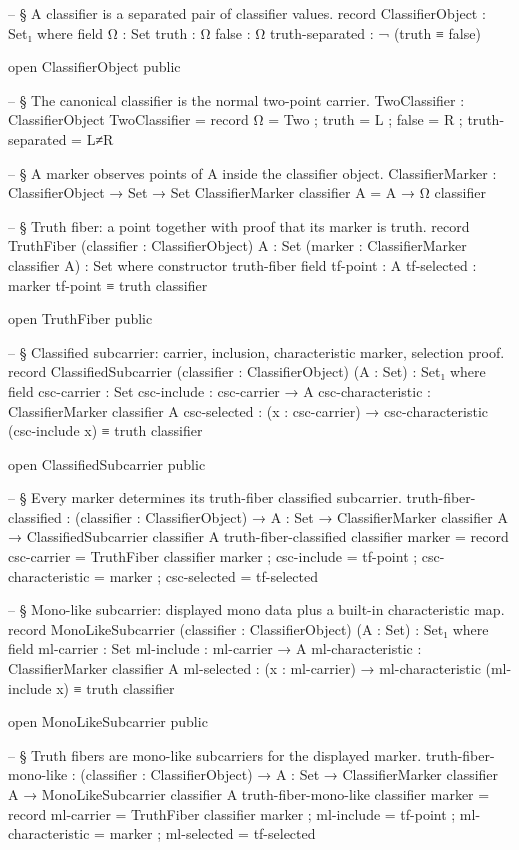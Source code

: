 \documentclass[11pt]{article}
\begin{document}
\begin{code}
-- § A classifier is a separated pair of classifier values.
record ClassifierObject : Set₁ where
  field
    Ω               : Set
    truth           : Ω
    false           : Ω
    truth-separated : ¬ (truth ≡ false)

open ClassifierObject public

-- § The canonical classifier is the normal two-point carrier.
TwoClassifier : ClassifierObject
TwoClassifier = record
  { Ω               = Two
  ; truth           = L
  ; false           = R
  ; truth-separated = L≠R
  }

-- § A marker observes points of A inside the classifier object.
ClassifierMarker : ClassifierObject → Set → Set
ClassifierMarker classifier A = A → Ω classifier

-- § Truth fiber: a point together with proof that its marker is truth.
record TruthFiber (classifier : ClassifierObject)
                  {A : Set}
                  (marker : ClassifierMarker classifier A) : Set where
  constructor truth-fiber
  field
    tf-point    : A
    tf-selected : marker tf-point ≡ truth classifier

open TruthFiber public

-- § Classified subcarrier: carrier, inclusion, characteristic marker, selection proof.
record ClassifiedSubcarrier (classifier : ClassifierObject) (A : Set) : Set₁ where
  field
    csc-carrier        : Set
    csc-include        : csc-carrier → A
    csc-characteristic : ClassifierMarker classifier A
    csc-selected       : (x : csc-carrier) →
                         csc-characteristic (csc-include x) ≡ truth classifier

open ClassifiedSubcarrier public

-- § Every marker determines its truth-fiber classified subcarrier.
truth-fiber-classified :
  (classifier : ClassifierObject) →
  {A : Set} →
  ClassifierMarker classifier A → ClassifiedSubcarrier classifier A
truth-fiber-classified classifier marker = record
  { csc-carrier        = TruthFiber classifier marker
  ; csc-include        = tf-point
  ; csc-characteristic = marker
  ; csc-selected       = tf-selected
  }

-- § Mono-like subcarrier: displayed mono data plus a built-in characteristic map.
record MonoLikeSubcarrier (classifier : ClassifierObject) (A : Set) : Set₁ where
  field
    ml-carrier        : Set
    ml-include        : ml-carrier → A
    ml-characteristic : ClassifierMarker classifier A
    ml-selected       : (x : ml-carrier) →
                        ml-characteristic (ml-include x) ≡ truth classifier

open MonoLikeSubcarrier public

-- § Truth fibers are mono-like subcarriers for the displayed marker.
truth-fiber-mono-like :
  (classifier : ClassifierObject) →
  {A : Set} →
  ClassifierMarker classifier A → MonoLikeSubcarrier classifier A
truth-fiber-mono-like classifier marker = record
  { ml-carrier        = TruthFiber classifier marker
  ; ml-include        = tf-point
  ; ml-characteristic = marker
  ; ml-selected       = tf-selected
  }
\end{code}
\end{document}
